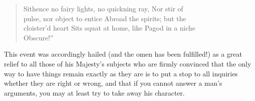 \begin{verse}
    Sithence no fairy lights, no quickning ray, Nor stir of\\
    pulse, nor object to entice Abroad the spirits; but the\\
    cloister'd heart Sits squat at home, like Pagod in a niche\\
    Obscure!''

\end{verse}
This event was accordingly hailed (and the omen has been
fulfilled!) as a great relief to all those of his Majesty's
subjects who are firmly convinced that the only way to have things
remain exactly as they are is to put a stop to all inquiries
whether they are right or wrong, and that if you cannot answer a
man's arguments, you may at least try to take away his character.

